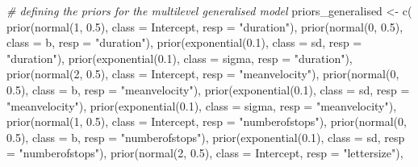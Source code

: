 \documentclass[
  11pt,
  english,
  ,doc,floatsintext]{apa6}
\newenvironment{Shaded}{}{}
\newcommand{\AttributeTok}[1]{\textcolor[rgb]{0.49,0.56,0.16}{#1}}
\newcommand{\CommentTok}[1]{\textcolor[rgb]{0.38,0.63,0.69}{\textit{#1}}}
\newcommand{\DecValTok}[1]{\textcolor[rgb]{0.25,0.63,0.44}{#1}}
\newcommand{\FloatTok}[1]{\textcolor[rgb]{0.25,0.63,0.44}{#1}}
\newcommand{\FunctionTok}[1]{\textcolor[rgb]{0.02,0.16,0.49}{#1}}
\newcommand{\NormalTok}[1]{#1}
\newcommand{\OtherTok}[1]{\textcolor[rgb]{0.00,0.44,0.13}{#1}}
\newcommand{\StringTok}[1]{\textcolor[rgb]{0.25,0.44,0.63}{#1}}
\begin{document}
\begin{Shaded}
\begin{Highlighting}[]
\CommentTok{\# defining the priors for the multilevel generalised model}
\NormalTok{priors\_generalised }\OtherTok{\textless{}{-}} \FunctionTok{c}\NormalTok{(}
    \FunctionTok{prior}\NormalTok{(}\FunctionTok{normal}\NormalTok{(}\DecValTok{1}\NormalTok{, }\FloatTok{0.5}\NormalTok{), }\AttributeTok{class =}\NormalTok{ Intercept, }\AttributeTok{resp =} \StringTok{"duration"}\NormalTok{),}
    \FunctionTok{prior}\NormalTok{(}\FunctionTok{normal}\NormalTok{(}\DecValTok{0}\NormalTok{, }\FloatTok{0.5}\NormalTok{), }\AttributeTok{class =}\NormalTok{ b, }\AttributeTok{resp =} \StringTok{"duration"}\NormalTok{),}
    \FunctionTok{prior}\NormalTok{(}\FunctionTok{exponential}\NormalTok{(}\FloatTok{0.1}\NormalTok{), }\AttributeTok{class =}\NormalTok{ sd, }\AttributeTok{resp =} \StringTok{"duration"}\NormalTok{),}
    \FunctionTok{prior}\NormalTok{(}\FunctionTok{exponential}\NormalTok{(}\FloatTok{0.1}\NormalTok{), }\AttributeTok{class =}\NormalTok{ sigma, }\AttributeTok{resp =} \StringTok{"duration"}\NormalTok{),}
    \FunctionTok{prior}\NormalTok{(}\FunctionTok{normal}\NormalTok{(}\DecValTok{2}\NormalTok{, }\FloatTok{0.5}\NormalTok{), }\AttributeTok{class =}\NormalTok{ Intercept, }\AttributeTok{resp =} \StringTok{"meanvelocity"}\NormalTok{),}
    \FunctionTok{prior}\NormalTok{(}\FunctionTok{normal}\NormalTok{(}\DecValTok{0}\NormalTok{, }\FloatTok{0.5}\NormalTok{), }\AttributeTok{class =}\NormalTok{ b, }\AttributeTok{resp =} \StringTok{"meanvelocity"}\NormalTok{),}
    \FunctionTok{prior}\NormalTok{(}\FunctionTok{exponential}\NormalTok{(}\FloatTok{0.1}\NormalTok{), }\AttributeTok{class =}\NormalTok{ sd, }\AttributeTok{resp =} \StringTok{"meanvelocity"}\NormalTok{),}
    \FunctionTok{prior}\NormalTok{(}\FunctionTok{exponential}\NormalTok{(}\FloatTok{0.1}\NormalTok{), }\AttributeTok{class =}\NormalTok{ sigma, }\AttributeTok{resp =} \StringTok{"meanvelocity"}\NormalTok{),}
    \FunctionTok{prior}\NormalTok{(}\FunctionTok{normal}\NormalTok{(}\DecValTok{1}\NormalTok{, }\FloatTok{0.5}\NormalTok{), }\AttributeTok{class =}\NormalTok{ Intercept, }\AttributeTok{resp =} \StringTok{"numberofstops"}\NormalTok{),}
    \FunctionTok{prior}\NormalTok{(}\FunctionTok{normal}\NormalTok{(}\DecValTok{0}\NormalTok{, }\FloatTok{0.5}\NormalTok{), }\AttributeTok{class =}\NormalTok{ b, }\AttributeTok{resp =} \StringTok{"numberofstops"}\NormalTok{),}
    \FunctionTok{prior}\NormalTok{(}\FunctionTok{exponential}\NormalTok{(}\FloatTok{0.1}\NormalTok{), }\AttributeTok{class =}\NormalTok{ sd, }\AttributeTok{resp =} \StringTok{"numberofstops"}\NormalTok{),}
    \FunctionTok{prior}\NormalTok{(}\FunctionTok{normal}\NormalTok{(}\DecValTok{2}\NormalTok{, }\FloatTok{0.5}\NormalTok{), }\AttributeTok{class =}\NormalTok{ Intercept, }\AttributeTok{resp =} \StringTok{"lettersize"}\NormalTok{),}

\end{Highlighting}
\end{Shaded}
\end{document}
